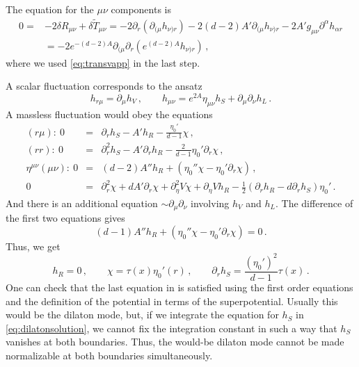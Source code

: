 The equation for the $\mu\nu$ components is
\begin{align}
0=& -2\delta R_{\mu\nu}+\delta \widetilde T_{\mu\nu}
=-2\partial_r\left(\partial_{(\mu}h_{\nu)r}\right)-2(d-2)A'\partial_{(\mu}h_{\nu)r}-2A' g_{\mu\nu}\partial^\alpha h_{\alpha r}
\\ \nonumber&=-2e^{-(d-2)A}\partial_{(\mu}\partial_r\left( e^{(d-2)A} h_{\nu)r}\right)\,,
\end{align}
where we used \cref{eq:transvapp} in the last step.

A scalar fluctuation corresponds to the ansatz
\begin{equation}
	h_{r\mu}=\partial_\mu h_V
	\,,\qquad h_{\mu\nu}=e^{2A}\eta_{\mu\nu}h_S+\partial_\mu\partial_\nu h_L\,.
\end{equation}
A massless fluctuation would obey the equations
\begin{subequations}\label{eq:dilatonmode}
\begin{eqnarray}
	(r\mu): \ 0 &=& \partial_r h_S-A' h_R-\frac{\eta_0'}{d-1}\chi
	\,,\\
	(rr): \ 0&=& \partial_r^2 h_S-A'\partial_r h_R-\frac{2}{d-1}\eta_0'\partial_r \chi
	\,,\\
	\eta^{\mu\nu}(\mu\nu): \ 0&=&(d-2) A'' h_R+(\eta_0''\chi-\eta_0' \partial_r\chi)\,,\\
	0&=& \partial_r^2 \chi+dA'\partial_r\chi+\partial_\eta^2 V\chi+\partial_\eta V h_R-\frac{1}{2}(\partial_r h_R-d\partial_r h_S)\eta_0'\,.
\end{eqnarray}
\end{subequations}
And there is an additional equation $\sim \partial_\mu\partial_\nu$ involving $h_V$ and $h_L$.
The difference of the first two equations gives
\begin{equation}
	(d-1)A''h_R+(\eta_0''\chi-\eta_0'\partial_r\chi)=0\,.
\end{equation}
Thus, we get
\begin{equation}\label{eq:dilatonsolution}
	h_R=0
	\,,\qquad \chi=\tau(x) \eta_0'(r)
	\,,\qquad
	\partial_r h_S=\frac{(\eta_0')^2}{d-1}\tau(x)\,.
\end{equation}
One can check that the last equation in  is satisfied using the first order equations and the definition of the potential in terms of the superpotential.
Usually this would be the dilaton mode, but, if we integrate the equation for $h_S$ in \cref{eq:dilatonsolution}, we cannot fix the integration constant in such a way that $h_S$ vanishes at both boundaries.
Thus, the would-be dilaton mode cannot be made normalizable at both boundaries simultaneously.

